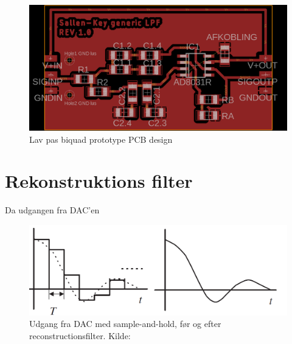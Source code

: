 \begin{figure}[H]
	\includegraphics[width=\linewidth]{billeder/skbiquadpcb}
	\caption{Lav pas biquad prototype PCB design}
	\label{fig:skbiquadpcb}
\end{figure}
\section{Rekonstruktions filter}

Da udgangen fra DAC'en 
\begin{figure}[H]
	\includegraphics[width=\linewidth]{billeder/dacrecon}
	\caption{Udgang fra DAC med sample-and-hold, før og efter reconstructionsfilter. Kilde:\cite{Tan2013}}
	\label{fig:skbiquadpcb}
\end{figure}
